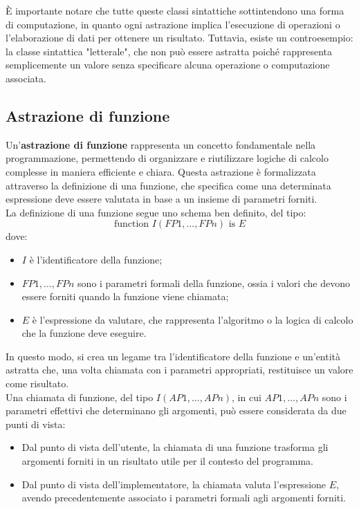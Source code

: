\documentclass{article}
\begin{document}
	È importante notare che tutte queste classi sintattiche sottintendono una forma di computazione, in quanto ogni astrazione implica l'esecuzione di operazioni o l'elaborazione di dati per ottenere un risultato. Tuttavia, esiste un controesempio: la classe sintattica "letterale", che non può essere astratta poiché rappresenta semplicemente un valore senza specificare alcuna operazione o computazione associata.

	\subsection{Astrazione di funzione}
	Un'\textbf{astrazione di funzione} rappresenta un concetto fondamentale nella programmazione, permettendo di organizzare e riutilizzare logiche di calcolo complesse in maniera efficiente e chiara. Questa astrazione è formalizzata attraverso la definizione di una funzione, che specifica come una determinata espressione deve essere valutata in base a un insieme di parametri forniti.
	\\
	La definizione di una funzione segue uno schema ben definito, del tipo:
	\[
	\text{{function }} I(FP1, ..., FPn) \text{{ is }} E
	\]
	dove:
	\begin{itemize}
		\item $I$ è l'identificatore della funzione;
		\item $FP1, ..., FPn$ sono i parametri formali della funzione, ossia i valori che devono essere forniti quando la funzione viene chiamata;
		\item $E$ è l'espressione da valutare, che rappresenta l'algoritmo o la logica di calcolo che la funzione deve eseguire.
	\end{itemize}
	In questo modo, si crea un legame tra l'identificatore della funzione e un'entità astratta che, una volta chiamata con i parametri appropriati, restituisce un valore come risultato.
	\\
	Una chiamata di funzione, del tipo $I(AP1, ..., APn)$, in cui $AP1, ..., APn$ sono i parametri effettivi che determinano gli argomenti, può essere considerata da due punti di vista:
	\begin{itemize}
		\item Dal punto di vista dell'utente, la chiamata di una funzione trasforma gli argomenti forniti in un risultato utile per il contesto del programma.
		\item Dal punto di vista dell'implementatore, la chiamata valuta l'espressione $E$, avendo precedentemente associato i parametri formali agli argomenti forniti.
	\end{itemize}
\end{document}
